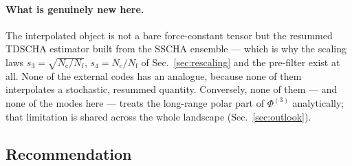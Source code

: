 \documentclass[11pt,a4paper]{article}
\newcommand{\Nc}{N_{\mathrm{c}}}
\newcommand{\Nf}{N_{\mathrm{f}}}
\begin{document}
\paragraph{What is genuinely new here.}  The interpolated object is not a
bare force-constant tensor but the resummed TDSCHA estimator built from
the SSCHA ensemble --- which is why the scaling laws
$s_3=\sqrt{\Nc/\Nf}$, $s_4=\Nc/\Nf$ of Sec.~\ref{sec:rescaling} and the
pre-filter exist at all.  None of the external codes has an analogue,
because none of them interpolates a stochastic, resummed quantity.
Conversely, none of them --- and none of the modes here --- treats the
long-range polar part of $\Phi^{(3)}$ analytically; that limitation is
shared across the whole landscape (Sec.~\ref{sec:outlook}).

\subsection{Recommendation}
\label{sec:codes-opinion}
\end{document}

